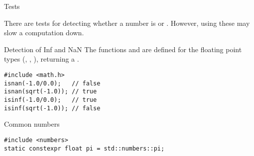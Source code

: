 
 {Tests}

There are tests for detecting whether a number is  or
. However, using these may slow a computation down.

\begin{block}{Detection of Inf and NaN}
  The functions  and  are
  defined for the floating point types (, , ), returning a .
\begin{lstlisting}
#include <math.h>
isnan(-1.0/0.0);   // false
isnan(sqrt(-1.0)); // true
isinf(-1.0/0.0);   // true
isinf(sqrt(-1.0)); // false
\end{lstlisting}
\end{block}

 {Common numbers}
\label{sec:std-numbers}

\begin{lstlisting}
#include <numbers>
static constexpr float pi = std::numbers::pi;
\end{lstlisting}

